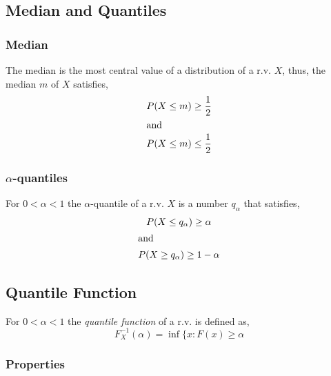 \subsection{Median and Quantiles} %
\label{sub:median_and_quantiles}

\subsubsection{Median} %
\label{ssub:median}

The median is the most central value of a distribution of a r.v. $X$, thus, the
median $m$ of $X$ satisfies,
\begin{gather*}
    P(X \leq m) \geq \dfrac{1}{2}\\
    \intertext{and}
    P(X \leq m) \leq \dfrac{1}{2}
\end{gather*}


\subsubsection{$\alpha$-quantiles} %
\label{ssub:_alpha_quantiles}

For $0 < \alpha < 1$ the $\alpha$-quantile of a r.v. $X$ is a number $q_\alpha$
that satisfies,
\begin{gather*}
    P(X \leq q_\alpha) \geq \alpha\\
    \intertext{and}
    P(X \geq q_\alpha) \geq 1- \alpha
\end{gather*}



\subsection{Quantile Function} %
\label{sub:quantile_function}

For $0 < \alpha < 1$ the \emph{quantile function} of a r.v. is defined as,
\begin{equation*}
    F^{-1}_X (\alpha) = \inf \{ x : F(x) \geq \alpha 
\end{equation*}


\subsubsection{Properties} %
\label{ssub:properties05}

